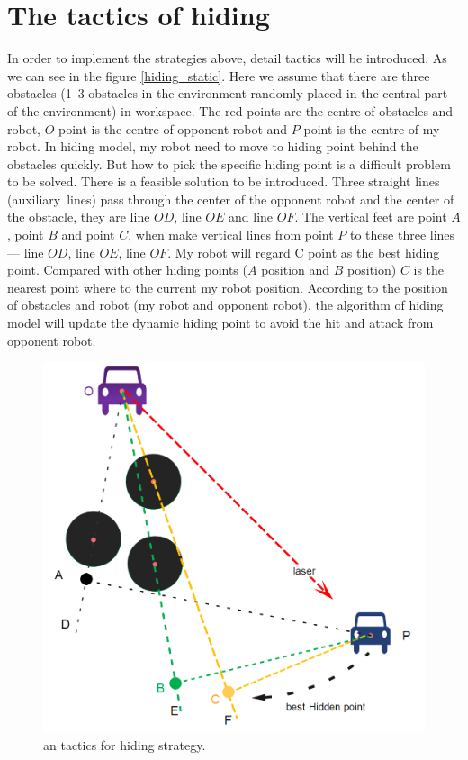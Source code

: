 \section{The tactics of hiding}
In order to implement the strategies above, detail tactics will be introduced. As we can see in the figure \ref{hiding_static}. Here we assume that there are three obstacles (1~3 obstacles in the environment randomly placed in the central part of the environment) in workspace. The red points are the centre of obstacles and robot,  $O$ point is the centre of opponent robot and $P$ point is the centre of my robot. In hiding model,  my robot need to move to hiding point behind the obstacles quickly. But how to pick the specific hiding point is a difficult problem to be solved. There is a feasible solution to be introduced.
Three straight lines (auxiliary lines) pass through the center of the opponent robot and the center of the obstacle, they are line $OD$, line $OE$ and line $OF$. The vertical feet are point $A$, point $B$ and point $C$, when make vertical lines from point $P$ to these three lines— line $OD$, line $OE$, line $OF$. My robot will regard C point as the best hiding point. Compared with other hiding points ($A$ position and $B$ position) $C$ is the nearest point where to the current my robot position. According to the position of obstacles and robot (my robot and opponent robot), the algorithm of hiding model will update the dynamic hiding point to avoid the hit and attack from opponent robot.

\begin{figure}[thb]
    \centering
    \includegraphics[width=1\textwidth]{images/PathPlaningHidingModel.png}
    \caption[an tactics for  hiding strategy]{an tactics for  hiding strategy.}\label{hiding_tactic}
\end{figure}


